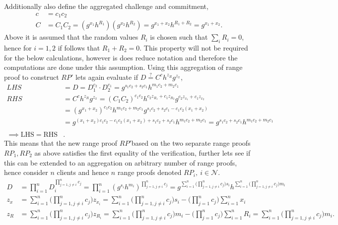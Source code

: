 Additionally also define the aggregated challenge and commitment,
\begin{align*}
c &= c_1c_2 \\
C &= C_1C_2 = (g^{x_1}h^{R_1}) (g^{x_2}h^{R_2}) = g^{x_1+x_2}h^{R_1+R_2}= g^{x_1+x_2}.
\end{align*}
Above it is assumed that the random values $R_i$ is chosen such that $\sum_i R_i = 0$, hence for $i=1,2$ if follows that $R_1+R_2 =0$. This property will not be required for the below calculations, however is does reduce notation and therefore the computations are done under this assumption. 
Using this  aggregation of range proof to construct $RP'$ lets again evaluate if $D\overset{?}{=} C^ch^{z_R}g^{z_x}$,
\begin{align*}
LHS &= D = D_1^{c_2}\cdot D_2^{c_1} =g^{s_1c_2+s_2c_1}h^{m_1c_2+m_2c_1} \\
RHS &= C^ch^{z_R}g^{z_x} = (C_1C_2)^{c_1c_2}h^{c_2z_{R_1}+c_1z_{R_2}}g^{c_2z_{x_1}+c_1z_{x_2}}\\ 
&=(g^{x_1 + x_2})^{c_1c_2} h^{m_1c_2 +m_2c_1} g^{s_1c_2+ s_2c_1- c_1c_2(x_1+x_2)}  \\
&= g^{(x_1+x_2)c_1c_2 - c_1c_2(x_1+x_2) +s_1c_2+s_2c_1} h^{m_1c_2 +m_2c_1} = g^{s_1c_2+s_2c_1} h^{m_1c_2 +m_2c_1} \\
\\ \implies \text{LHS} =\text{RHS}&.
\end{align*}
This means that the new range proof $RP'$based on the two separate range proofs $RP_1,RP_2$ as above satisfies the first equality of the verification, further lets see if this can be extended to an aggregation on arbitrary number of range proofs, hence consider $n$ clients and hence $n$ range proofs denoted $RP_i,\: i\in\mathcal{N}$. 
\begin{equation}
\begin{aligned}
\label{eq:aggDn}
D &=\prod_{i=1}^n  D_i ^{\prod_{j=1, j\neq i}^n  c_j }  =  \prod_{i=1}^n  (g^{s_i}h^{m_i}) ^{\prod_{j=1, j\neq i}^n  c_j } = g ^ {\sum_{i=1}^n \Big(\prod_{j=1, j\neq i}^n   c_j \Big)s_i} h^ {\sum_{i=1}^n \Big(\prod_{j=1, j\neq i}^n   c_j \Big)m_i}\\
z_x &= \sum_{i=1}^n \Big( \prod_{j=1,j\neq i}^n c_j \Big) z_{x_i} = \sum_{i=1}^n \Big( \prod_{j=1, j\neq i}^n c_j \Big)s_i - \big( \prod_{j=1}^n c_j \Big) \sum_{i=1}^n x_i\\
z_R &=  \sum_{i=1}^n \Big( \prod_{j=1,j\neq i}^n c_j \Big) z_{R_i} = \sum_{i=1}^n \Big( \prod_{j=1, j\neq i}^n c_j \Big)m_i - \big( \prod_{j=1}^n c_j \Big) \sum_{i=1}^n R_i = \sum_{i=1}^n \Big( \prod_{j=1, j\neq i}^n c_j \Big)m_i.
\end{aligned}
\end{equation}
